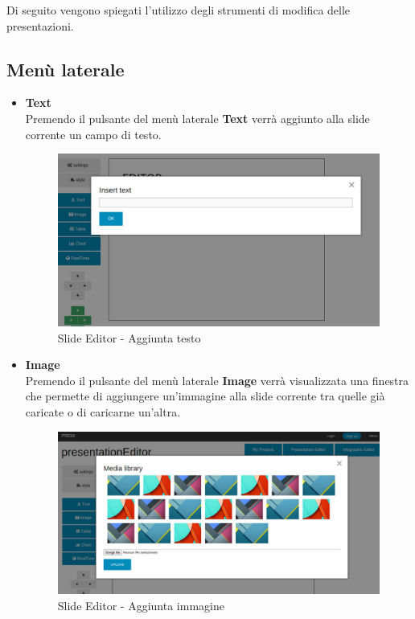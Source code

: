 \noindent
Di seguito vengono spiegati l'utilizzo degli strumenti di modifica delle presentazioni.

\subsection{Menù laterale}
\begin{itemize}
 \item \textbf{Text}\\
    Premendo il pulsante del menù laterale \textbf{Text} verrà aggiunto alla slide corrente un campo di testo.
    \begin{figure}[h] 
	\centering 
	\includegraphics[scale=0.30] {img/MUAddText.png}
	\caption{Slide Editor - Aggiunta testo} 
    \end{figure}
 \item \textbf{Image}\\
    Premendo il pulsante del menù laterale \textbf{Image} verrà visualizzata una finestra che permette di aggiungere un'immagine alla slide corrente tra quelle già caricate o di caricarne un'altra.
     \begin{figure}[h] 
	\centering 
	\includegraphics[scale=0.30] {img/MUAddImage.png}
	\caption{Slide Editor - Aggiunta immagine} 

\end{figure}
\end{itemize}

